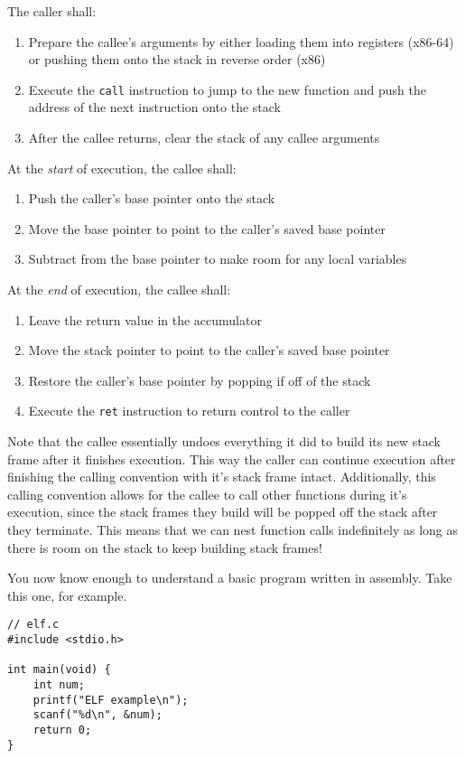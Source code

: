 The caller shall:
\begin{enumerate}
    \item Prepare the callee's arguments by either loading them into registers
        (x86-64) or pushing them onto the stack in reverse order (x86)
    \item Execute the \texttt{call} instruction to jump to the new function and
        push the address of the next instruction onto the stack
    \item After the callee returns, clear the stack of any callee arguments
\end{enumerate}

At the \emph{start} of execution, the callee shall:
\begin{enumerate}
    \item Push the caller's base pointer onto the stack
    \item Move the base pointer to point to the caller's saved base pointer
    \item Subtract from the base pointer to make room for any local variables
\end{enumerate}

At the \emph{end} of execution, the callee shall:
\begin{enumerate}
    \item Leave the return value in the accumulator
    \item Move the stack pointer to point to the caller's saved base pointer
    \item Restore the caller's base pointer by popping if off of the stack
    \item Execute the \texttt{ret} instruction to return control to the caller
\end{enumerate}

Note that the callee essentially undoes everything it did to build its new stack
frame after it finishes execution. This way the caller can continue execution
after finishing the calling convention with it's stack frame intact.
Additionally, this calling convention allows for the callee to call other
functions during it's execution, since the stack frames they build will be
popped off the stack after they terminate. This means that we can nest function
calls indefinitely as long as there is room on the stack to keep building stack
frames!

You now know enough to understand a basic program written in assembly. Take this
one, for example.

\begin{lstlisting}
// elf.c 
#include <stdio.h>

int main(void) {
    int num;
    printf("ELF example\n");
    scanf("%d\n", &num);
    return 0;
}
\end{lstlisting}

